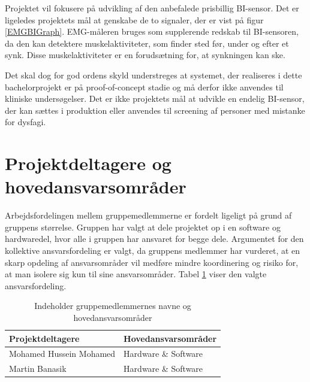Projektet vil fokusere på udvikling af den anbefalede prisbillig BI-sensor. Det er ligeledes projektets mål at genskabe de to signaler, der er vist på figur \ref{EMGBIGraph}. EMG-måleren bruges som supplerende redskab til BI-sensoren, da den kan detektere muskelaktiviteter, som finder sted før, under og efter et synk. Disse muskelaktiviteter er en forudsætning for, at synkningen kan ske. 

Det skal dog for god ordens skyld understreges at systemet, der realiseres i dette bachelorprojekt er på proof-of-concept stadie og må derfor ikke anvendes til kliniske undersøgelser. Det er ikke projektets mål at udvikle en endelig BI-sensor, der kan sættes i produktion eller anvendes til screening af personer med mistanke for dysfagi. 

\section{Projektdeltagere og hovedansvarsområder} 
Arbejdsfordelingen  mellem gruppemedlemmerne er fordelt ligeligt på grund af gruppens størrelse. Gruppen har valgt at dele projektet op i en software og hardwaredel, hvor alle i gruppen har ansvaret for  begge dele. Argumentet for den kollektive ansvarsfordeling er valgt, da gruppens medlemmer har vurderet, at en skarp opdeling af ansvarsområder vil medføre mindre koordinering og risiko for, at man isolere sig kun til sine ansvarsområder. Tabel \ref{Ansvarsfordeling} viser den valgte ansvarsfordeling. 

\begin{table}[H]
\centering

\begin{tabular}{|l|l|}
\hline
\textbf{Projektdeltagere}        & \textbf{Hovedansvarsområder}  \\ \hline
Mohamed Hussein Mohamed & Hardware \& Software \\ \hline
Martin Banasik          & Hardware \& Software \\ \hline


\end{tabular}

\caption{Indeholder gruppemedlemmernes navne og hovedansvarsområder }
\label{Ansvarsfordeling}
\end{table}



